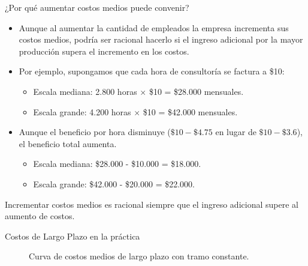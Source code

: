 \documentclass{beamer}
\begin{document}
\begin{frame}{¿Por qué aumentar costos medios puede convenir?}
    \begin{itemize}
        \item Aunque al aumentar la cantidad de empleados la empresa incrementa sus costos medios, podría ser racional hacerlo si el ingreso adicional por la mayor producción supera el incremento en los costos.
        \item Por ejemplo, supongamos que cada hora de consultoría se factura a \$10:
        \begin{itemize}
            \item Escala mediana: 2.800 horas $\times$ \$10 = \$28.000 mensuales.
            \item Escala grande: 4.200 horas $\times$ \$10 = \$42.000 mensuales.
        \end{itemize}
        \item Aunque el beneficio por hora disminuye ($\$10-\$4.75$ en lugar de $\$10-\$3.6$), el beneficio total aumenta.
        \begin{itemize}
            \item Escala mediana: \$28.000 - \$10.000 = \$18.000.
            \item Escala grande: \$42.000 - \$20.000 = \$22.000.
        \end{itemize}
    \end{itemize}
    \begin{boxA}
        \small Incrementar costos medios es racional siempre que el ingreso adicional supere al aumento de costos.
    \end{boxA}
\end{frame}


\begin{frame}{Costos de Largo Plazo en la práctica}

    \begin{figure}[ht]
        \centering
        \caption{Curva de costos medios de largo plazo con tramo constante.}
        \end{figure}
\end{frame}
\end{document}
